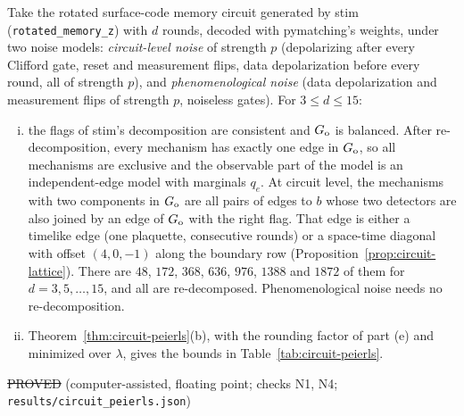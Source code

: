 \begin{proposition}\label{prop:circuit-numbers}
Take the rotated surface-code memory circuit generated by stim~\cite{stim} (\texttt{rotated\_memory\_z}) with $d$ rounds, decoded with pymatching's weights, under two noise models:
\emph{circuit-level noise} of strength $p$ (depolarizing after every Clifford gate, reset and measurement flips, data depolarization before every round, all of strength $p$), and
\emph{phenomenological noise} (data depolarization and measurement flips of strength $p$, noiseless gates).
For $3\le d\le15$:
\begin{enumerate}[(i)]
\item the flags of stim's decomposition are consistent and $G_{\rm o}$ is balanced. After re-decomposition, every mechanism has exactly one edge in $G_{\rm o}$, so all mechanisms are exclusive and the observable part of the model is an independent-edge model with marginals $q_e$.
At circuit level, the mechanisms with two components in $G_{\rm o}$ are all pairs of edges to $b$ whose two detectors are also joined by an edge of $G_{\rm o}$ with the right flag. That edge is either a timelike edge (one plaquette, consecutive rounds) or a space-time diagonal with offset $(4,0,-1)$ along the boundary row (Proposition~\ref{prop:circuit-lattice}). There are $48$, $172$, $368$, $636$, $976$, $1388$ and $1872$ of them for $d=3,5,\dots,15$, and all are re-decomposed. Phenomenological noise needs no re-decomposition.
\item Theorem~\ref{thm:circuit-peierls}(b), with the rounding factor of part (e) and minimized over $\lambda$, gives the bounds in Table~\ref{tab:circuit-peierls}.
\end{enumerate}
\hfill\st{PROVED} (computer-assisted, floating point; checks N1, N4; \texttt{results/circuit\_peierls.json})
\end{proposition}

